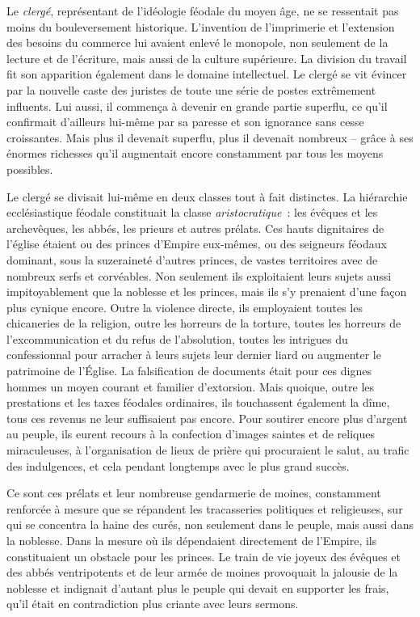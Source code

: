 \documentclass[french,twoside]{book} %
\begin{document}
Le \emph{clergé}, représentant de l’idéologie féodale du moyen âge, ne se ressentait pas moins du bouleversement historique. L’invention de l’imprimerie et l’extension des besoins du commerce lui avaient enlevé le monopole, non seulement de la lecture et de l’écriture, mais aussi de la culture supérieure. La division du travail fit son apparition également dans le domaine intellectuel. Le clergé se vit évincer par la nouvelle caste des juristes de toute une série de postes extrêmement influents. Lui aussi, il commença à devenir en grande partie superflu, ce qu’il confirmait d’ailleurs lui-même par sa paresse et son ignorance sans cesse croissantes. Mais plus il devenait superflu, plus il devenait nombreux – grâce à ses énormes richesses qu’il augmentait encore constamment par tous les moyens possibles.\par
Le clergé se divisait lui-même en deux classes tout à fait distinctes. La hiérarchie ecclésiastique féodale constituait la classe \emph{aristocratique} : les évêques et les archevêques, les abbés, les prieurs et autres prélats. Ces hauts dignitaires de l’église étaient ou des princes d’Empire eux-mêmes, ou des seigneurs féodaux dominant, sous la suzeraineté d’autres princes, de vastes territoires avec de nombreux serfs et corvéables. Non seulement ils exploitaient leurs sujets aussi impitoyablement que la noblesse et les princes, mais ils s’y prenaient d’une façon plus cynique encore. Outre la violence directe, ils employaient toutes les chicaneries de la religion, outre les horreurs de la torture, toutes les horreurs de l’excommunication et du refus de l’absolution, toutes les intrigues du confessionnal pour arracher à leurs sujets leur dernier liard ou augmenter le patrimoine de l’Église. La falsification de documents était pour ces dignes hommes un moyen courant et familier d’extorsion. Mais quoique, outre les prestations et les taxes féodales ordinaires, ils touchassent également la dîme, tous ces revenus ne leur suffisaient pas encore. Pour soutirer encore plus d’argent au peuple, ils eurent recours à la confection d’images saintes et de reliques miraculeuses, à l’organisation de lieux de prière qui procuraient le salut, au trafic des indulgences, et cela pendant longtemps avec le plus grand succès.\par
Ce sont ces prélats et leur nombreuse gendarmerie de moines, constamment renforcée à mesure que se répandent les tracasseries politiques et religieuses, sur qui se concentra la haine des curés, non seulement dans le peuple, mais aussi dans la noblesse. Dans la mesure où ils dépendaient directement de l’Empire, ils constituaient un obstacle pour les princes. Le train de vie joyeux des évêques et des abbés ventripotents et de leur armée de moines provoquait la jalousie de la noblesse et indignait d’autant plus le peuple qui devait en supporter les frais, qu’il était en contradiction plus criante avec leurs sermons.\par
\end{document}
